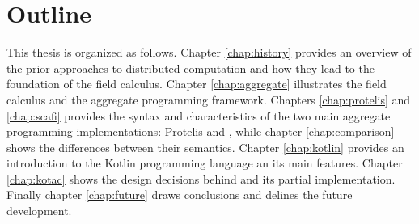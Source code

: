 \section{Outline}
This thesis is organized as follows. Chapter \ref{chap:history} provides an overview of the prior approaches to distributed computation and how they lead to the foundation of the field calculus. Chapter \ref{chap:aggregate} illustrates the field calculus and the aggregate programming framework. Chapters \ref{chap:protelis} and \ref{chap:scafi} provides the syntax and characteristics of the two main aggregate programming implementations: Protelis and \Scafi{}, while chapter \ref{chap:comparison} shows the differences between their semantics. Chapter \ref{chap:kotlin} provides an introduction to the Kotlin programming language an its main features. Chapter \ref{chap:kotac} shows the design decisions behind \Kotac{} and its partial implementation. Finally chapter \ref{chap:future} draws conclusions and delines the future development.
